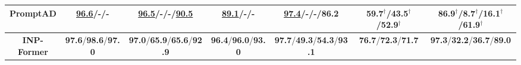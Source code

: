 \documentclass[letterpaper]{article} %
\begin{document}
\begin{table*}[!ht]
{{\begin{tabular}{c|cc|cc|cc}
PromptAD~\cite{PromptAD}   & \underline{96.6}/-/-       & \underline{96.5}/-/-/\underline{90.5}       & \underline{89.1}/-/-       & \underline{97.4}/-/-/86.2         & \multicolumn{1}{c|}{59.7$^{\dagger}$/43.5$^{\dagger}$/52.9$^{\dagger}$}                         & 86.9$^{\dagger}$/8.7$^{\dagger}$/16.1$^{\dagger}$/61.9$^{\dagger}$  \\ \midrule
\rowcolor{Light} 
\textbf{INP-Former} & \textbf{97.6}/\textbf{98.6}/\textbf{97.0} & \textbf{97.0}/\textbf{65.9}/\textbf{65.6}/\textbf{92.9}& \textbf{96.4}/\textbf{96.0}/\textbf{93.0} & \textbf{97.7}/\textbf{49.3}/\textbf{54.3}/\textbf{93.1} & \multicolumn{1}{c|}{\cellcolor{Light}\textbf{76.7}/\textbf{72.3}/\textbf{71.7}} & \textbf{97.3}/\textbf{32.2}/\textbf{36.7}/\textbf{89.0} \\ \bottomrule[1.5pt]
\end{tabular}}}
\vspace{-3mm}
\end{table*}
\end{document}

